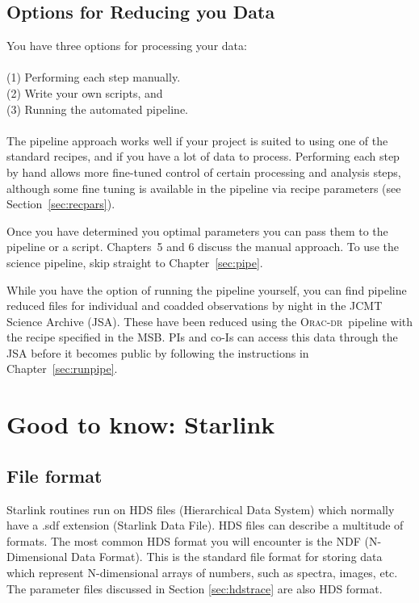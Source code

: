 \documentclass[twoside,11pt]{article}
\newcommand{\htmladdnormallink}[2]{#1}
\newcommand{\htmlref}[2]{#1}
\newcommand{\latexhtml}[2]{#1}
\newcommand{\xlabel}[1]{}
\renewcommand{\_}{\texttt{\symbol{95}}}
\newcommand{\oracdr}{\htmladdnormallink{\textsc{Orac-dr}}{http://www.oracdr.org/oracdr}}
\newcommand{\cref}[3]{\latexhtml{#1~\ref{#2}}{\htmlref{#3}{#2}}}
\begin{document}
\subsection{\xlabel{software}Options for Reducing you Data}

You have three options for processing your data:
\\\\
(1) Performing each step manually.\\
(2) Write your own scripts, and \\
(3) Running the automated pipeline.
\\\\
The pipeline approach works well if your project is suited to using one of the
standard recipes, and if you have a lot of data to process. Performing
each step by hand allows more fine-tuned control of certain
processing and analysis steps, although some fine tuning is available in the pipeline via recipe parameters (see \cref{Section}{sec:recpars}{Recipe parameters}).

Once you have determined you optimal parameters you can pass them to the
pipeline or a script. Chapters~5 and 6 discuss the manual approach. To use the science pipeline, skip
straight to \cref{Chapter}{sec:pipe}{The ACSIS Pipeline}.

While you have the option of running the pipeline yourself, you can find pipeline reduced files for individual and coadded observations by night in the \htmladdnormallink{JCMT Science Archive}{http://www3.cadc-ccda.hia-iha.nrc-cnrc.gc.ca/jcmt/} (JSA). These have been reduced using the \oracdr\ pipeline with the recipe specified in the MSB. PIs and co-Is can access this data through the JSA before it becomes public by following the instructions in \cref{Chapter}{sec:runpipe}{The ACSIS Pipeline}.

\newpage
\section{\xlabel{starlink}Good to know: Starlink}
\label{sec:starlink}
\subsection{File format}
\label{sec:format}
Starlink routines run on HDS files (Hierarchical Data System) which normally have a .sdf extension (Starlink Data File). HDS files can describe a multitude of formats. The most common HDS format you will encounter is the NDF (N-Dimensional Data Format). This is the standard file format for storing data which represent N-dimensional arrays of numbers, such as spectra, images, etc. The parameter files discussed in Section \ref{sec:hdstrace} are also HDS format.
\end{document}
